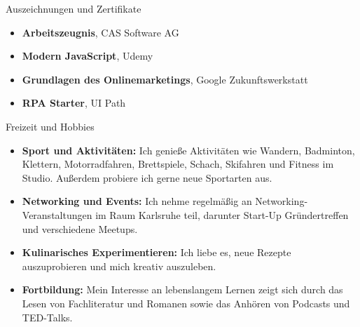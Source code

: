 \documentclass{resume} %
\begin{document}

\begin{rSection}{Auszeichnungen und Zertifikate}
    \vspace{0.5em}

    \begin{itemize}
        \item \textbf{Arbeitszeugnis}, CAS Software AG
        \item \textbf{Modern JavaScript}, Udemy
        \item \textbf{Grundlagen des Onlinemarketings}, Google Zukunftswerkstatt
        \item \textbf{RPA Starter}, UI Path
    \end{itemize}


\end{rSection}


\begin{rSection}{Freizeit und Hobbies}
    \vspace{0.5em}
    \begin{itemize}
        \item \raggedright{\textbf{Sport und Aktivitäten:} Ich genieße Aktivitäten wie Wandern, Badminton, Klettern, Motorradfahren, Brettspiele, Schach, Skifahren und Fitness im Studio. Außerdem probiere ich gerne neue Sportarten aus.}
        \item \raggedright{\textbf{Networking und Events:} Ich nehme regelmäßig an Networking-Veranstaltungen im Raum Karlsruhe teil, darunter Start-Up Gründertreffen und verschiedene Meetups.}
        \item \raggedright{\textbf{Kulinarisches Experimentieren:} Ich liebe es, neue Rezepte auszuprobieren und mich kreativ auszuleben.} 
        \item \raggedright{\textbf{Fortbildung:} Mein Interesse an lebenslangem Lernen zeigt sich durch das Lesen von Fachliteratur und Romanen sowie das Anhören von Podcasts und TED-Talks.}
    \end{itemize}


\end{rSection}
\end{document}
